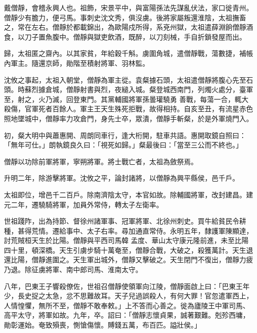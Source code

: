 \begin{pinyinscope}
 戴僧靜，會稽永興人也。祖飾，宋景平中，與富陽孫法先謀亂伏法，家口徙青州。僧靜少有膽力，便弓馬。事刺史沈文秀，俱沒虜。後將家屬叛還淮陰，太祖撫畜之，常在左右。僧靜於都載錦出，為歐陽戍所得，系兗州獄，太祖遣薛淵餉僧靜酒食，以刀子置魚腹中。僧靜與獄吏飲酒，既醉，以刀刻械，手自折鎖發屋而出。



 歸，太祖匿之齋內。以其家貧，年給穀千斛。虜圍角城，遣僧靜戰，蕩數捷，補帳內軍主。隨還京師，勛階至積射將軍、羽林監。



 沈攸之事起，太祖入朝堂，僧靜為軍主從。袁粲據石頭，太祖遣僧靜將腹心先至石頭。時蘇烈據倉城，僧靜射書與烈，夜縋入城。粲登城西南門，列燭火處分，臺軍至，射之，火乃滅，回登東門。其黨輔國將軍孫曇瓘驍勇
 善戰，每蕩一合，輒大殺傷，官軍死者百餘人。軍主王天生殊死拒戰，故得相持。自亥至丑，有流星赤色照地墜城中，僧靜率力攻倉門，身先士卒，眾潰，僧靜手斬粲，於是外軍燒門入。



 初，粲大明中與蕭惠開、周朗同車行，逢大桁開，駐車共語。惠開取鏡自照曰：「無年可仕。」朗執鏡良久曰：「視死如歸。」粲最後曰：「當至三公而不終也。」



 僧靜以功除前軍將軍，寧朔將軍。將士戰亡者，太祖為斂祭焉。



 升明二年，除游擊將軍。沈攸之平，論封諸將，以僧靜為興平縣侯，邑千戶。



 太祖即位，增邑千二百戶。除南濟陰太守，本官如故。除輔國將軍，改封建昌。建元二年，遷驍騎將軍，加員外常侍，轉太子左衛率。



 世祖踐阼，出為持節、督徐州諸軍事、冠軍將軍、北徐州刺史。買牛給貧民令耕種，甚得荒情。遷給事中、太子右率。尋加通直常侍。永明五年，隸護軍陳顯達，討荒賊桓天生於比陽。僧靜與平西司馬韓
 孟度、華山太守康元隆前進，未至比陽四十里，頓深橋。天生引虜步騎十萬奄至，僧靜合戰，大破之，殺獲萬計。天生退還比陽，僧靜進圍之。天生軍出城外，僧靜又擊破之。天生閉門不復出，僧靜力疲乃退。除征虜將軍、南中郎司馬、淮南太守。



 八年，巴東王子響殺僚佐，世祖召僧靜使領軍向江陵，僧靜面啟上曰：「巴東王年少，長史捉之太急，忿不思難故耳。天子兒過誤殺人，有何大罪！官忽遣軍西上，人情惶懼，無所不至，僧靜不敢奉敕。」上不答而心善之。徙為廬陵王中軍司馬、高平太守，將軍如故。九年，卒。詔曰：「僧靜志懷貞果，誠著艱難。剋殄西墉，勛彰運始。奄致殞喪，惻愴傷懷。賻錢五萬，布百匹。謚壯侯。」




\end{pinyinscope}
